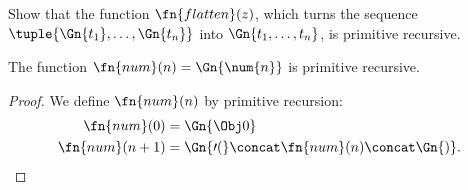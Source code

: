 \documentclass[../../../include/open-logic-section]{subfiles}
\begin{document}
\begin{prob}
Show that the function $\fn{flatten}(z)$, which turns the sequence
$\tuple{\Gn{t_1}, \dots, \Gn{t_n}}$ into $\Gn{t_1, \dots, t_n}$, is
primitive recursive.
\end{prob}

\begin{prop}
  The function $\fn{num}(n) = \Gn{\num{n}}$ is primitive recursive.
\end{prop}

\begin{proof}
  We define $\fn{num}(n)$ by primitive recursion:
  \begin{align*}
    \fn{num}(0) & = \Gn{\Obj 0}\\
    \fn{num}(n+1) & = \Gn{\prime(} \concat \fn{num}(n) \concat \Gn{)}.
  \end{align*}
\end{proof}
\end{document}

